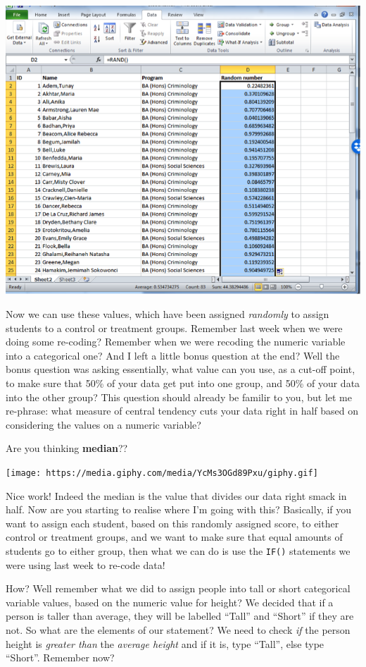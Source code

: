 \documentclass[]{book}
\theoremstyle{definition}
\theoremstyle{definition}
\theoremstyle{definition}
\theoremstyle{remark}
\begin{document}
\includegraphics{imgs/rand_nums.png}

Now we can use these values, which have been assigned \emph{randomly} to
assign students to a control or treatment groups. Remember last week
when we were doing some re-coding? Remember when we were recoding the
numeric variable into a categorical one? And I left a little bonus
question at the end? Well the bonus question was asking essentially,
what value can you use, as a cut-off point, to make sure that 50\% of
your data get put into one group, and 50\% of your data into the other
group? This question should already be familir to you, but let me
re-phrase: what measure of central tendency cuts your data right in half
based on considering the values on a numeric variable?

Are you thinking \textbf{median}??

\texttt{[image: https://media.giphy.com/media/YcMs3OGd89Pxu/giphy.gif]}

Nice work! Indeed the median is the value that divides our data right
smack in half. Now are you starting to realise where I'm going with
this? Basically, if you want to assign each student, based on this
randomly assigned score, to either control or treatment groups, and we
want to make sure that equal amounts of students go to either group,
then what we can do is use the \texttt{IF()} statements we were using
last week to re-code data!

How? Well remember what we did to assign people into tall or short
categorical variable values, based on the numeric value for height? We
decided that if a person is taller than average, they will be labelled
``Tall'' and ``Short'' if they are not. So what are the elements of our
statement? We need to check \emph{if} the person height is \emph{greater
than} the \emph{average height} and if it is, type ``Tall'', else type
``Short''. Remember now?
\end{document}
